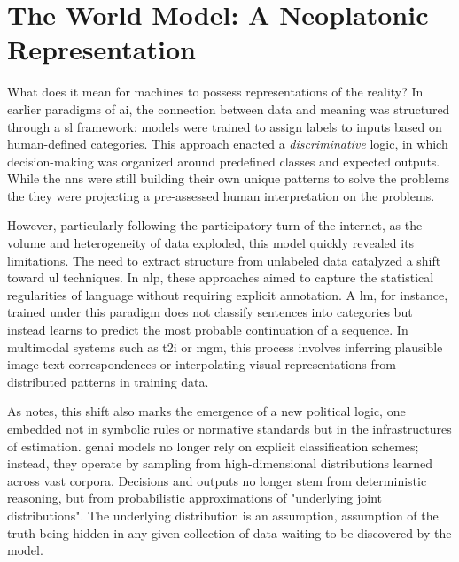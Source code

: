 \section{The World Model: A Neoplatonic Representation}




What does it mean for machines to possess representations of the reality? In earlier paradigms of \gls{ai}, the connection between data and meaning was structured through a \gls{sl} framework: models were trained to assign labels to inputs based on human-defined categories. This approach enacted a \textit{discriminative} logic, in which decision-making was organized around predefined classes and expected outputs. While the \glspl{nn} were still building their own unique patterns to solve the problems the they were projecting a pre-assessed human interpretation on the problems.

However, particularly following the participatory turn of the internet, as the volume and heterogeneity of data exploded, this model quickly revealed its limitations. The need to extract structure from unlabeled data catalyzed a shift toward \gls{ul} techniques. In \gls{nlp}, these approaches aimed to capture the statistical regularities of language without requiring explicit annotation. A \gls{lm}, for instance, trained under this paradigm does not classify sentences into categories but instead learns to predict the most probable continuation of a sequence. In multimodal systems such as \gls{t2i} or \gls{mgm}, this process involves inferring plausible image-text correspondences or interpolating visual representations from distributed patterns in training data.

As \textcite[3]{amoore2024} notes, this shift also marks the emergence of a new political logic, one embedded not in symbolic rules or normative standards but in the infrastructures of estimation. \gls{genai} models no longer rely on explicit classification schemes; instead, they operate by sampling from high-dimensional distributions learned across vast corpora. Decisions and outputs no longer stem from deterministic reasoning, but from probabilistic approximations of "underlying joint distributions". The underlying distribution is an assumption, assumption of the truth being hidden in any given collection of data waiting to be discovered by the model.


